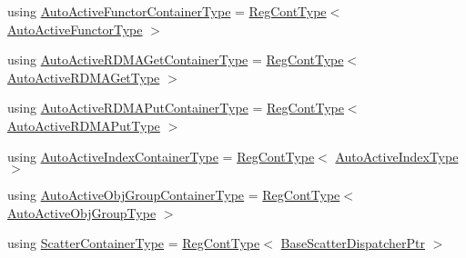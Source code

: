 \begin{DoxyCompactItemize}
\item 
using \hyperlink{namespacevt_1_1auto__registry_abe0cefefe73cf87e520a5ab3ebc88f4a}{Auto\+Active\+Functor\+Container\+Type} = \hyperlink{namespacevt_1_1auto__registry_a988a4943e4c8fe82b56f5b13bddceb2b}{Reg\+Cont\+Type}$<$ \hyperlink{namespacevt_1_1auto__registry_a092979b3ed6cf9e21e6a5823fdaa0c12}{Auto\+Active\+Functor\+Type} $>$
\item 
using \hyperlink{namespacevt_1_1auto__registry_a85bc3ac8c35caf2f304c24a73a07f1c6}{Auto\+Active\+R\+D\+M\+A\+Get\+Container\+Type} = \hyperlink{namespacevt_1_1auto__registry_a988a4943e4c8fe82b56f5b13bddceb2b}{Reg\+Cont\+Type}$<$ \hyperlink{namespacevt_1_1auto__registry_a039813f93a5804c77ae612e0318fb335}{Auto\+Active\+R\+D\+M\+A\+Get\+Type} $>$
\item 
using \hyperlink{namespacevt_1_1auto__registry_a7051002e8986239f9c5f986384ebec66}{Auto\+Active\+R\+D\+M\+A\+Put\+Container\+Type} = \hyperlink{namespacevt_1_1auto__registry_a988a4943e4c8fe82b56f5b13bddceb2b}{Reg\+Cont\+Type}$<$ \hyperlink{namespacevt_1_1auto__registry_a1f67d3efa37b61040b56258ca59df088}{Auto\+Active\+R\+D\+M\+A\+Put\+Type} $>$
\item 
using \hyperlink{namespacevt_1_1auto__registry_a892918ae7bc486701964f7e5e0bb0c8a}{Auto\+Active\+Index\+Container\+Type} = \hyperlink{namespacevt_1_1auto__registry_a988a4943e4c8fe82b56f5b13bddceb2b}{Reg\+Cont\+Type}$<$ \hyperlink{namespacevt_1_1auto__registry_ad5ff1c3344b954a1e1212c72c74e4a7a}{Auto\+Active\+Index\+Type} $>$
\item 
using \hyperlink{namespacevt_1_1auto__registry_a2328b4aa12baaa0b0fc0bf07ed2be755}{Auto\+Active\+Obj\+Group\+Container\+Type} = \hyperlink{namespacevt_1_1auto__registry_a988a4943e4c8fe82b56f5b13bddceb2b}{Reg\+Cont\+Type}$<$ \hyperlink{namespacevt_1_1auto__registry_a861d9d01e89c81f0a955188724aa25b3}{Auto\+Active\+Obj\+Group\+Type} $>$
\item 
using \hyperlink{namespacevt_1_1auto__registry_a0f315fdd34135b6a311be7225157bb6b}{Scatter\+Container\+Type} = \hyperlink{namespacevt_1_1auto__registry_a988a4943e4c8fe82b56f5b13bddceb2b}{Reg\+Cont\+Type}$<$ \hyperlink{namespacevt_1_1auto__registry_aba7be4c573c0f1361c024e4d3293a62a}{Base\+Scatter\+Dispatcher\+Ptr} $>$
\end{DoxyCompactItemize}
